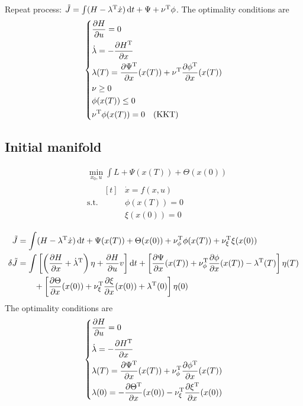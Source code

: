Repeat process: $\tilde J = \int(H-\lambda^\text{T}\dot x)\mathop{}\!\mathrm{d} t + \Psi + \nu^\text{T}\phi$. The optimality conditions are
\[
  \begin{dcases}
    \frac{\partial H}{\partial u} = 0 \\
    \dot\lambda = -\frac{\partial H^\text{T}}{\partial x} \\
    \lambda(T) = \frac{\partial \Psi^\text{T}}{\partial x}(x(T)) + \nu^\text{T}\frac{\partial \phi^\text{T}}{\partial x}(x(T)) \\
    \nu \ge 0 \\
    \phi(x(T)) \le 0 \\
    \nu^\text{T} \phi(x(T)) = 0 \quad (\text{KKT})
  \end{dcases}
\]

\subsection{Initial manifold}
\begin{align}
  & \min_{x_0,u} \int L + \Psi(x(T)) + \Theta(x(0)) \\
  & \text{s.t. } \begin{aligned}[t]
    & \dot x = f(x,u) \\
    & \phi(x(T)) = 0 \\
    & \xi(x(0)) = 0
  \end{aligned}
\end{align}

\begin{align}
  \tilde J &= \int (H-\lambda^\text{T}\dot x)\mathop{}\!\mathrm{d} t + \Psi(x(T)) + \Theta(x(0)) + \nu^\text{T}_\phi \phi(x(T)) + \nu^\text{T}_\xi \xi(x(0)) \\
  \delta \tilde J &= \int \left[ \left( \frac{\partial H}{\partial x} + \dot\lambda^\text{T} \right) \eta + \frac{\partial H}{\partial u}v\right] \mathop{}\!\mathrm{d} t + \left[ \frac{\partial \Psi}{\partial x}(x(T)) + \nu^\text{T}_\phi \frac{\partial \phi}{\partial x}(x(T)) - \lambda^\text{T}(T) \right] \eta(T) \\
           & \qquad + \left[ \frac{\partial \Theta}{\partial x}(x(0)) + \nu^\text{T}_\xi \frac{\partial \xi}{\partial x}(x(0)) + \lambda^\text{T}(0) \right] \eta(0)
\end{align}
The optimality conditions are
\[
  \begin{dcases}
    \frac{\partial H}{\partial u} = 0 \\
    \dot\lambda = -\frac{\partial H^\text{T}}{\partial x} \\
    \lambda(T) = \frac{\partial \Psi^\text{T}}{\partial x}(x(T)) + \nu^\text{T}_\phi \frac{\partial \phi^\text{T}}{\partial x}(x(T)) \\
    \lambda(0) = -\frac{\partial \Theta^\text{T}}{\partial x}(x(0)) - \nu^\text{T}_\xi \frac{\partial \xi^\text{T}}{\partial x}(x(0))
  \end{dcases}
\]

